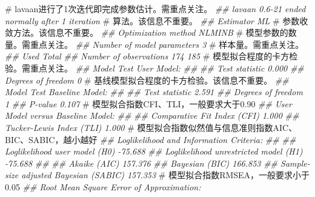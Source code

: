 \documentclass[
  chinese-hans,
  letterpaper,
  DIV=11,
  numbers=noendperiod]{scrartcl}
\newenvironment{Shaded}{\begin{snugshade}}{\end{snugshade}}
\newcommand{\CommentTok}[1]{\textcolor[rgb]{0.37,0.37,0.37}{#1}}
\newcommand{\DocumentationTok}[1]{\textcolor[rgb]{0.37,0.37,0.37}{\textit{#1}}}
\begin{document}
\begin{Shaded}
\begin{Highlighting}[numbers=left,,]
\CommentTok{\# lavaan进行了1次迭代即完成参数估计。需重点关注。}
\DocumentationTok{\#\# lavaan 0.6{-}21 ended normally after 1 iteration}
\CommentTok{\# 算法。该信息不重要。}
\DocumentationTok{\#\#   Estimator                                         ML}
\CommentTok{\# 参数收敛方法。该信息不重要。}
\DocumentationTok{\#\#   Optimization method                           NLMINB}
\CommentTok{\# 模型参数的数量。需重点关注。}
\DocumentationTok{\#\#   Number of model parameters                         3}
\CommentTok{\# 样本量。需重点关注。}
\DocumentationTok{\#\#                                                   Used       Total}
\DocumentationTok{\#\#   Number of observations                           174         185}
\CommentTok{\# 模型拟合程度的卡方检验。需重点关注。 }
\DocumentationTok{\#\# Model Test User Model:}
\DocumentationTok{\#\#                                                       }
\DocumentationTok{\#\#   Test statistic                                 0.000}
\DocumentationTok{\#\#   Degrees of freedom                                 0}
\CommentTok{\# 基线模型拟合程度的卡方检验。该信息不重要。}
\DocumentationTok{\#\# Model Test Baseline Model:}
\DocumentationTok{\#\# }
\DocumentationTok{\#\#  Test statistic                                 2.591}
\DocumentationTok{\#\#  Degrees of freedom                                 1}
\DocumentationTok{\#\#  P{-}value                                        0.107}
\CommentTok{\# 模型拟合指数CFI、TLI，一般要求大于0.90}
\DocumentationTok{\#\# User Model versus Baseline Model:}
\DocumentationTok{\#\# }
\DocumentationTok{\#\#   Comparative Fit Index (CFI)                    1.000}
\DocumentationTok{\#\#   Tucker{-}Lewis Index (TLI)                       1.000}
\CommentTok{\# 模型拟合指数似然值与信息准则指数AIC、BIC、SABIC，越小越好}
\DocumentationTok{\#\# Loglikelihood and Information Criteria:}
\DocumentationTok{\#\# }
\DocumentationTok{\#\#  Loglikelihood user model (H0)                {-}75.688}
\DocumentationTok{\#\#  Loglikelihood unrestricted model (H1)        {-}75.688}
\DocumentationTok{\#\#                                                      }
\DocumentationTok{\#\#  Akaike (AIC)                                 157.376}
\DocumentationTok{\#\#  Bayesian (BIC)                               166.853}
\DocumentationTok{\#\#  Sample{-}size adjusted Bayesian (SABIC)        157.353}
\CommentTok{\# 模型拟合指数RMSEA，一般要求小于0.05 }
\DocumentationTok{\#\# Root Mean Square Error of Approximation:}

\end{Highlighting}
\end{Shaded}
\end{document}
